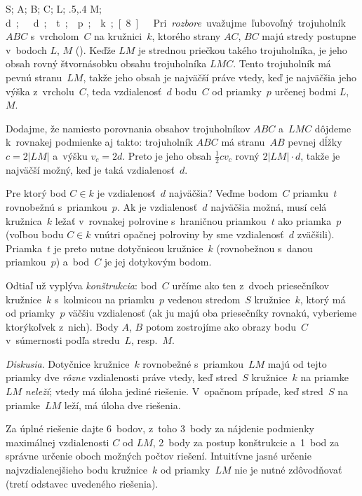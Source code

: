 {%
\fontplace
\rpoint S; \rpoint A; \lpoint B; \bpoint C;
\rBpoint L; \bpoint\xy.5,.4 M;
\lBpoint\down\unit d; \lBpoint\down\unit d;
\lpoint t; \lpoint p; \rBpoint k;
[8] \hfil\Obr

Pri {\it rozbore\/} uvažujme ľubovoľný trojuholník $ABC$ s~vrcholom~$C$ na
kružnici~$k$, ktorého strany $AC$, $BC$ majú stredy postupne
v~bodoch $L$, $M$ (\obr). Keďže $LM$ je strednou priečkou
takého trojuholníka, je jeho obsah rovný štvornásobku obsahu trojuholníka
$LMC$. Tento trojuholník má pevnú stranu~$LM$, takže jeho obsah je
najväčší práve vtedy, keď je najväčšia jeho výška z~vrcholu~$C$, teda
vzdialenosť~$d$ bodu~$C$ od priamky~$p$ určenej bodmi $L$, $M$.
\inspicture{}

Dodajme, že namiesto porovnania obsahov trojuholníkov $ABC$ a~$LMC$ dôjdeme k~rovnakej
podmienke aj takto: trojuholník $ABC$ má stranu~$AB$ pevnej dĺžky
$c=2|LM|$ a~výšku $v_c=2d$. Preto je jeho obsah $\frac12cv_c$
rovný $2|LM|\cdot d$, takže je najväčší možný, keď je taká
vzdialenosť~$d$.

Pre ktorý bod $C\in k$ je vzdialenosť~$d$ najväčšia? Veďme bodom~$C$
priamku~$t$ rovnobežnú s~priamkou~$p$. Ak je vzdialenosť~$d$
najväčšia možná, musí celá kružnica~$k$ ležať v~rovnakej polrovine
s~hraničnou priamkou~$t$ ako priamka~$p$ (voľbou bodu $C\in k$
vnútri opačnej polroviny by sme vzdialenosť~$d$ zväčšili).
Priamka~$t$ je preto nutne dotyčnicou kružnice~$k$ (rovnobežnou 
s~danou priamkou~$p$) a~bod~$C$ je jej dotykovým bodom.

Odtiaľ už vyplýva {\it konštrukcia}: bod~$C$ určíme ako ten z~dvoch
priesečníkov kružnice~$k$ s~kolmicou na priamku~$p$ vedenou
stredom~$S$ kružnice~$k$, ktorý má od priamky~$p$ väčšiu vzdialenosť
(ak ju majú oba priesečníky rovnakú, vyberieme ktorýkoľvek z~nich).
Body $A$, $B$ potom zostrojíme ako obrazy bodu~$C$ v~súmernosti
podľa stredu~$L$, resp.~$M$.

{\it Diskusia}. Dotyčnice kružnice~$k$ rovnobežné s~priamkou~$LM$
majú od tejto priamky dve {\it rôzne\/} vzdialenosti práve vtedy, keď
stred~$S$ kružnice~$k$ na priamke~$LM$ {\it neleží}; vtedy má
úloha jediné riešenie. V~opačnom prípade, keď stred~$S$ na priamke~$LM$
leží, má úloha dve riešenia.

\nobreak\medskip\petit\noindent
Za úplné riešenie dajte 6~bodov, z~toho 3~body za nájdenie podmienky
maximálnej vzdialenosti $C$ od $LM$, 2~body za postup konštrukcie 
a~1~bod za správne určenie oboch možných počtov riešení. Intuitívne
jasné určenie najvzdialenejšieho bodu kružnice~$k$ od priamky~$LM$
nie je nutné zdôvodňovať (tretí odstavec uvedeného riešenia).
\endpetit
\bigbreak
}

